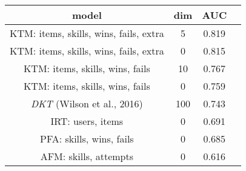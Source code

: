 \begin{tabular}{cccc}
\toprule
                      model &  dim &             AUC \\
\midrule
 KTM: items, skills, wins, fails, extra &  5 &  \alert{0.819}  \\
 KTM: items, skills, wins, fails, extra &  0 &  \alert{0.815}  \\
 KTM: items, skills, wins, fails &  10 &  0.767 \\
 KTM: items, skills, wins, fails &  0 &  0.759  \\
 \emph{DKT} (Wilson et al., 2016) &  100 & 0.743  \\
 IRT: users, items &  0 &  0.691  \\
 PFA: skills, wins, fails &  0 &  0.685  \\
 AFM: skills, attempts &  0 &  0.616 \\ \bottomrule
\end{tabular}
